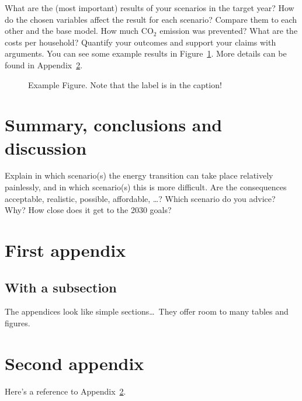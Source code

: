 \documentclass[11pt]{article}
\begin{document}
What are the (most important) results of your scenarios in the target year?
How do the chosen variables affect the result for each scenario?  Compare them to each other and the
base model. How much CO$_2$ emission was prevented? What are the costs per household?  Quantify your
outcomes and support your claims with arguments.  You can see some example results in Figure~\ref{fig:SRES}.
More details can be found in Appendix~\ref{app:firstApp}.

\begin{figure}
  \centering
  \caption{Example Figure.  Note that the label is in the caption!
    \label{fig:SRES}
  }
\end{figure}


\section{Summary, conclusions and discussion}
\label{sec:conclusions}

Explain in which scenario(s) the energy transition can take place relatively painlessly, and in which
scenario(s) this is more difficult. Are the consequences acceptable, realistic, possible, affordable, \ldots?
Which scenario do you advice? Why?  How close does it get to the 2030 goals?


\begin{appendices}  %
  \section{First appendix}
  \label{app:firstApp}
  
  \subsection*{With a subsection}
  
  The appendices look like simple sections\ldots\
  They offer room to many tables and figures.
  
  
  \section{Second appendix}
  Here's a reference to Appendix~\ref{app:firstApp}.
  
\end{appendices}
\end{document}
